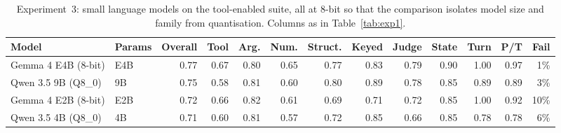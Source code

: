 \begin{table}[!t]
\centering
\caption{Experiment~3: small language models on the tool-enabled suite, all at 8-bit so that the comparison isolates model size and family from quantisation. Columns as in Table~\ref{tab:exp1}.}
\label{tab:exp2}
\small
\setlength{\tabcolsep}{4pt}
\begin{tabular}{@{}ll rrrrrrrrrrr@{}}
\toprule
Model & Params & Overall & Tool & Arg. & Num. & Struct. & Keyed & Judge & State & Turn & P/T & Fail \\
\midrule
Gemma 4 E4B (8-bit) & E4B & 0.77 & 0.67 & 0.80 & 0.65 & 0.77 & 0.83 & 0.79 & 0.90 & 1.00 & 0.97 & 1\% \\
Qwen 3.5 9B (Q8\_0) & 9B & 0.75 & 0.58 & 0.81 & 0.60 & 0.80 & 0.89 & 0.78 & 0.85 & 0.89 & 0.89 & 3\% \\
Gemma 4 E2B (8-bit) & E2B & 0.72 & 0.66 & 0.82 & 0.61 & 0.69 & 0.71 & 0.72 & 0.85 & 1.00 & 0.92 & 10\% \\
Qwen 3.5 4B (Q8\_0) & 4B & 0.71 & 0.60 & 0.81 & 0.57 & 0.72 & 0.85 & 0.66 & 0.85 & 0.78 & 0.78 & 6\% \\
\bottomrule
\end{tabular}
\end{table}
